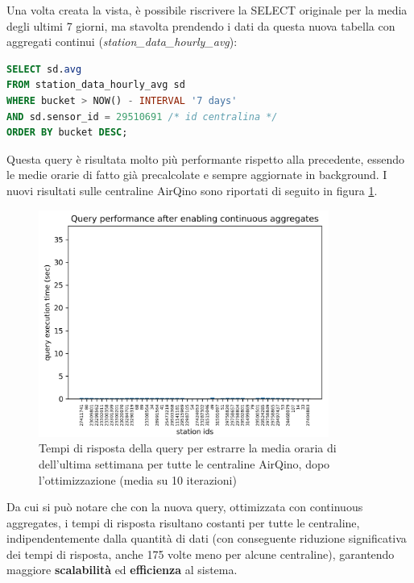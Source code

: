 Una volta creata la vista, è possibile riscrivere la SELECT originale per la media degli ultimi 7 giorni, ma stavolta prendendo i dati da questa nuova tabella con aggregati continui (\textit{station\_data\_hourly\_avg}):
\vspace{1mm}
\begin{lstlisting}[language=sql]
SELECT sd.avg
FROM station_data_hourly_avg sd
WHERE bucket > NOW() - INTERVAL '7 days'
AND sd.sensor_id = 29510691 /* id centralina */
ORDER BY bucket DESC;
\end{lstlisting}

Questa query è risultata molto più performante rispetto alla precedente, essendo le medie orarie di fatto già precalcolate e sempre aggiornate in background. I nuovi risultati sulle centraline AirQino sono riportati di seguito in figura \ref{fig:query-dopo}.

\begin{figure}[H]
\centering
\captionsetup{justification=centering}
\includegraphics[width=0.85\textwidth,height=\textheight,keepaspectratio]{img/query_dopo}
\caption{Tempi di risposta della query per estrarre la media oraria di  dell'ultima settimana per tutte le centraline AirQino, dopo l'ottimizzazione (media su 10 iterazioni)}
\label{fig:query-dopo}
\end{figure}

Da cui si può notare che con la nuova query, ottimizzata con continuous aggregates, i tempi di risposta risultano costanti per tutte le centraline, indipendentemente dalla quantità di dati (con conseguente riduzione significativa dei tempi di risposta, anche 175 volte meno per alcune centraline), garantendo maggiore \textbf{scalabilità} ed \textbf{efficienza} al sistema.
